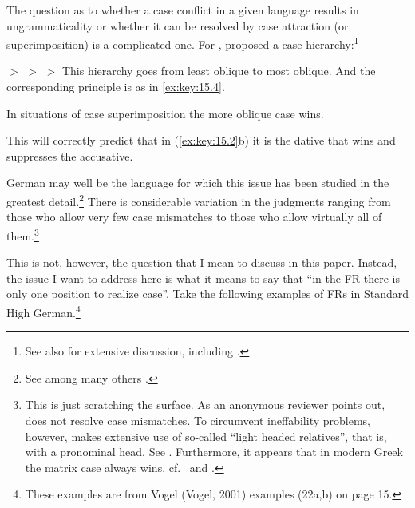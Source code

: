 \documentclass[output=paper]{langsci/langscibook}
\begin{document}
\begin{refcontext}
The question as to whether a case conflict in a given language results in
ungrammaticality or whether it can be resolved by case attraction (or
superimposition) is a complicated one. For ,
\textcite{Hirschbuhler1976} proposed a case hierarchy:\footnote{See also
    \citet{Harbert1983} for extensive discussion, including .}

\ea\label{ex:key:15.3}
    \Nom{} $>$ \Acc{} $>$ \Dat{} $>$ \Gen{}
\z
This hierarchy goes from least oblique to most oblique. And the corresponding
principle is as in \eqref{ex:key:15.4}.

\ea\label{ex:key:15.4}
    In situations of case superimposition the more oblique case wins.
\z

This will  correctly predict that in (\ref{ex:key:15.2}b) it is the dative that wins and
suppresses the accusative.

German may well be the language for which this issue has been studied in the
greatest detail.\footnote{See among many others \citet{Vogel2001}.} There is
considerable variation in the judgments ranging from those who allow very few
case mismatches to those who allow virtually all of them.\footnote{This is just
    scratching the surface. As an anonymous reviewer points out,  does
    not resolve case mismatches. To circumvent ineffability problems, however,
     makes extensive use of so-called \enquote{light headed relatives},
    that is,  with a pronominal head. See \citet{Citko2004}.
Furthermore, it appears that in modern Greek the matrix case always wins, cf.\
\citet{Daskalaki2011} and \citet{Spyropoulos2007}.\label{fn:15.6}}

This is not, however, the question that I mean to discuss in this paper.
Instead, the issue I want to address here is what it means to say that “in the
FR there is only one position to realize case”. Take the following examples of
\glspl{FR} in Standard High German.\footnote{These examples are from Vogel (Vogel,
2001) examples (22a,b) on page 15.}


\end{refcontext}
\end{document}
